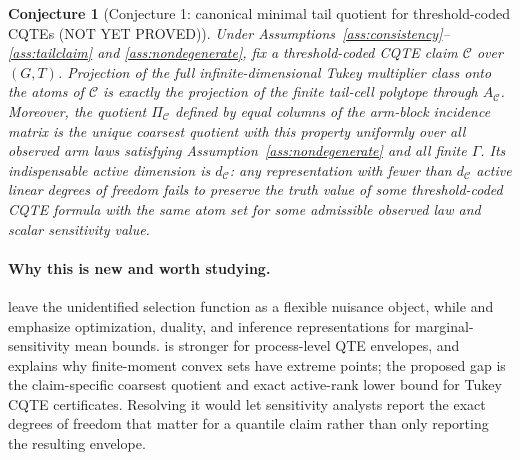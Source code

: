 \documentclass[11pt]{article}
\theoremstyle{definition}
\theoremstyle{plain}
\newtheorem{conjecture}{Conjecture}
\theoremstyle{remark}
\begin{document}
\begin{conjecture}[Conjecture 1: canonical minimal tail quotient for threshold-coded CQTEs (NOT YET PROVED)]\label{conj:tukey-tail-collapse}
Under Assumptions~\ref{ass:consistency}--\ref{ass:tailclaim} and \ref{ass:nondegenerate}, fix a threshold-coded CQTE claim \(\mathcal{C}\) over \((G,T)\).  Projection of the full infinite-dimensional Tukey multiplier class onto the atoms of \(\mathcal{C}\) is exactly the projection of the finite tail-cell polytope through \(A_{\mathcal{C}}\).  Moreover, the quotient \(\Pi_{\mathcal{C}}\) defined by equal columns of the arm-block incidence matrix is the unique coarsest quotient with this property uniformly over all observed arm laws satisfying Assumption~\ref{ass:nondegenerate} and all finite \(\Gamma\).  Its indispensable active dimension is \(d_{\mathcal{C}}\): any representation with fewer than \(d_{\mathcal{C}}\) active linear degrees of freedom fails to preserve the truth value of some threshold-coded CQTE formula with the same atom set for some admissible observed law and scalar sensitivity value.
\end{conjecture}
\paragraph{Why this is new and worth studying.}
\citet{DAmourFranksFeller2020} leave the unidentified selection function as a flexible nuisance object, while \citet{DornGuo2023} and \citet{Tan2024} emphasize optimization, duality, and inference representations for marginal-sensitivity mean bounds.  \citet{Wang2026} is stronger for process-level QTE envelopes, and \citet{Winkler1988} explains why finite-moment convex sets have extreme points; the proposed gap is the claim-specific coarsest quotient and exact active-rank lower bound for Tukey CQTE certificates.  Resolving it would let sensitivity analysts report the exact degrees of freedom that matter for a quantile claim rather than only reporting the resulting envelope.
\end{document}
